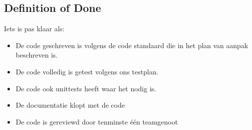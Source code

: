 \subsection{Definition of Done}
Iets is pas klaar als:
\begin{itemize}
    \item De code geschreven is volgens de code standaard die in het plan
          van aanpak beschreven is.
    \item De code volledig is getest volgens ons testplan.
    \item De code ook unittests heeft waar het nodig is.
    \item De documentatie klopt met de code
    \item De code is gereviewd door tenminste één teamgenoot
\end{itemize}
